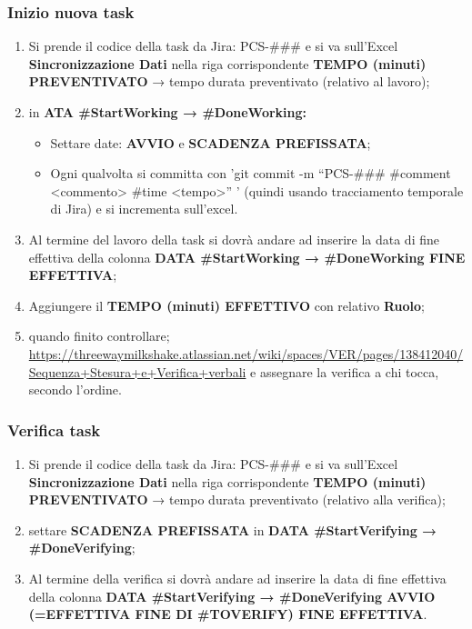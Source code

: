	\subsubsection{Inizio nuova task}
	\begin{enumerate}
		\item Si prende il codice della task da Jira: PCS-\#\#\# e si va sull’Excel \textbf{Sincronizzazione Dati} nella riga corrispondente \textbf{TEMPO (minuti) PREVENTIVATO} → tempo durata preventivato (relativo al lavoro);
		\item in \textbf{ATA \#StartWorking → \#DoneWorking: }
		\begin{itemize}
			\item Settare date: \textbf{AVVIO} e \textbf{SCADENZA PREFISSATA};
			\item Ogni qualvolta si committa con 'git commit -m “PCS-\#\#\# \#comment <commento> \#time <tempo>” ' (quindi usando tracciamento temporale di Jira) e si incrementa sull’excel.
		\end{itemize}
	\item Al termine del lavoro della task si dovrà andare ad inserire la data di fine effettiva della colonna \textbf{DATA \#StartWorking → \#DoneWorking FINE EFFETTIVA};
	\item Aggiungere il \textbf{TEMPO (minuti) EFFETTIVO} con relativo \textbf{Ruolo};
	\item quando finito controllare; \url{https://threewaymilkshake.atlassian.net/wiki/spaces/VER/pages/138412040/Sequenza+Stesura+e+Verifica+verbali} e assegnare la verifica a chi tocca, secondo l’ordine.
	\end{enumerate}

	\subsubsection{Verifica task}
	\begin{enumerate}
		\item Si prende il codice della task da Jira: PCS-\#\#\# e si va sull’Excel \textbf{Sincronizzazione Dati} nella riga corrispondente \textbf{TEMPO (minuti) PREVENTIVATO} → tempo durata preventivato (relativo alla verifica);
		\item settare \textbf{SCADENZA PREFISSATA} in \textbf{DATA \#StartVerifying → \#DoneVerifying};
		\item Al termine della verifica si dovrà andare ad inserire la data di fine effettiva della colonna \textbf{DATA \#StartVerifying → \#DoneVerifying AVVIO (=EFFETTIVA FINE DI \#TOVERIFY) FINE EFFETTIVA}.
		
	\end{enumerate}

